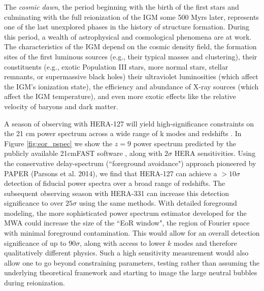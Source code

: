 \documentclass[ars]{/Users/daviddeboer1/Documents/Papers/Copernicus_LaTeX_Package_v_2_7/copernicus}
\begin{document}
The {\it cosmic dawn}, the period beginning with the birth of the first stars and
culminating with the full reionization of the IGM some 500 Myrs later, represents one
of the last unexplored phases in the history of structure formation. During this
period, a wealth of astrophysical and cosmological phenomena are at work. The
characteristics of the IGM depend on the cosmic density field, the formation sites of
the first luminous sources (e.g., their typical masses and clustering), their
constituents (e.g., exotic Population III stars, more normal stars, stellar remnants,
or supermassive black holes) their ultraviolet luminosities (which affect the IGM's
ionization state), the efficiency and abundance of X-ray sources (which affect the
IGM temperature), and even more exotic effects like the relative velocity of baryons
and dark matter.

A season of observing with HERA-127 will yield high-significance constraints on the
21 cm power spectrum across a wide range of k modes and redshifts
\citep{pober_et_al2014}. In Figure \ref{fig:eor_pspec} we show the $z=9$ power
spectrum predicted by the publicly available 21cmFAST software
\citep{mesinger_et_al2011}, along with $2\sigma$ HERA sensitivities. Using the
conservative delay-spectrum (``foreground avoidance") approach pioneered by PAPER
(Parsons et al. 2014), we find that HERA-127 can achieve a $> 10\sigma$ detection of
fiducial power spectra over a broad range of redshifts. The subsequent observing
season with HERA-331 can increase this detection significance to over $25\sigma$
using the same methods. With detailed foreground modeling, the more sophisticated
power spectrum estimator developed for the MWA could increase the size of the ``EoR
window", the region of Fourier space with minimal foreground contamination. This
would allow for an overall detection significance of up to $90\sigma$, along with
access to lower $k$ modes and therefore qualitatively different physics. Such a high
sensitivity measurement would also allow one to go beyond constraining parameters,
testing rather than assuming the underlying theoretical framework and starting to
image the large neutral bubbles during reionization.

%
\end{document}
